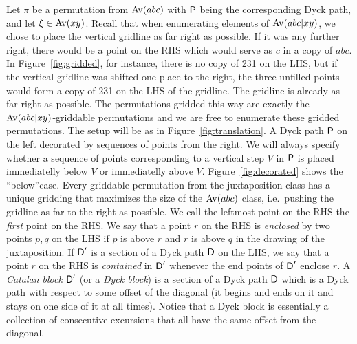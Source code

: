 \documentclass[12pt, a4paper, twoside]{report}
\begin{document}
Let $\pi$ be a permutation from $\mathrm{Av}(abc)$ with $\textsf{P}$ being the corresponding Dyck path, and let $\xi \in \mathrm{Av}(xy)$. Recall that when enumerating elements of $\mathrm{Av}(abc|xy)$, we chose to place the vertical gridline as far right as possible.  If it was any further right, there would be a point on the RHS which would serve as $c$ in a copy of $abc$. In Figure~\ref{fig:gridded}, for instance, there is no copy of 231 on the LHS, but if the vertical gridline was shifted one place to the right, the three unfilled points would form a copy of 231 on the LHS of the gridline. The gridline is already as far right as possible. The permutations gridded this way are exactly the $\mathrm{Av}(abc|xy)$-griddable permutations and we are free to enumerate these gridded permutations. The setup will be as in Figure~\ref{fig:translation}. A Dyck path $\textsf{P}$ on the left decorated by sequences of points from the right. We will always specify whether a sequence of points corresponding to a vertical step $V$ in $\textsf{P}$ is placed immediatelly below $V$ or immediatelly above $V$. Figure~\ref{fig:decorated} shows the ``below''case. Every griddable permutation from the juxtaposition class has a unique gridding that maximizes the size of the $\mathrm{Av}(abc)$ class, i.e.~pushing the gridline as far to the right as possible. We call the leftmost point on the RHS the \emph{first} point on the RHS. We say that a point $r$ on the RHS is \emph{enclosed} by two points $p,q$ on the LHS if $p$ is above $r$ and $r$ is above $q$ in the drawing of the juxtaposition. If $\textsf{D}'$ is a section of a Dyck path $\textsf{D}$ on the LHS, we say that a point $r$ on the RHS is \emph{contained} in $\textsf{D}'$ whenever the end points of $\textsf{D}'$ enclose $r$. A \emph{Catalan block} $\textsf{D}'$ (or a \emph{Dyck block}) is a section of a Dyck path $\textsf{D}$ which is a Dyck path with respect to some offset of the diagonal (it begins and ends on it and stays on one side of it at all times). Notice that a Dyck block is essentially a collection of consecutive excursions that all have the same offset from the diagonal.
\end{document}
